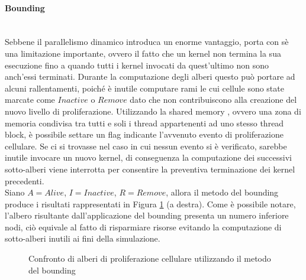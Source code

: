 \paragraph{Bounding}\mbox{}
\\
Sebbene il parallelismo dinamico introduca un enorme vantaggio, porta con sè
una limitazione importante, ovvero il fatto che un kernel non termina la sua
esecuzione fino a quando tutti i kernel invocati da quest'ultimo non sono
anch'essi terminati. Durante la computazione degli alberi questo può portare
ad alcuni rallentamenti, poiché è inutile computare rami le cui cellule
sono state marcate come $Inactive$ o $Remove$ dato che non contribuiscono
alla creazione del nuovo livello di proliferazione.
Utilizzando la shared memory \cite{sanders2010cuda}
, ovvero una zona di memoria condivisa tra tutti e soli i thread appartenenti ad
uno stesso thread block, è possibile
settare un flag indicante l'avvenuto evento di proliferazione
cellulare. Se ci si trovasse nel caso in cui nessun evento si è verificato,
sarebbe inutile invocare un nuovo kernel, di conseguenza
la computazione dei successivi sotto-alberi viene interrotta per consentire
la preventiva terminazione dei kernel precedenti.
\\
Siano $A = Alive$, $I = Inactive$, $R = Remove$, allora il metodo del bounding
produce i risultati rappresentati in Figura \ref{fig:tree-bounding} (a destra).
Come è possibile notare,
l'albero risultante dall'applicazione del
bounding presenta un numero inferiore nodi, ciò equivale al fatto di risparmiare
risorse evitando la computazione di sotto-alberi inutili ai fini della
simulazione.
\begin{figure}[t]
\begin{minipage}[b]{.5\linewidth}
\centering
{}
\end{minipage}
\begin{minipage}[b]{.5\linewidth}
\centering
{}
\end{minipage}
\caption{Confronto di alberi di proliferazione cellulare utilizzando il metodo
    del bounding}
\label{fig:tree-bounding}
\end{figure}

